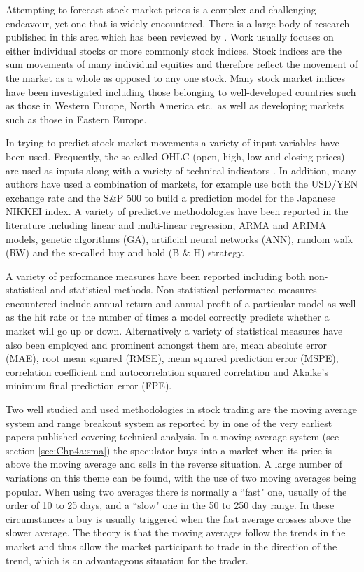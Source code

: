 Attempting to forecast stock market prices is a complex and challenging endeavour, yet one that is widely encountered. There is a large body of research published in this area which has been reviewed by \cite{Atsalakis20095932}. Work usually focuses on either individual stocks or more commonly stock indices. Stock indices are the sum movements of many individual equities and therefore reflect the movement of the market as a whole as opposed to any one stock. Many stock market indices have been investigated including those belonging to well-developed countries such as those in Western Europe, North America etc.\ as well as developing markets such as those in Eastern Europe.

In trying to predict stock market movements a variety of input variables have been used. Frequently, the so-called OHLC (open, high, low and closing prices) are used as inputs along with a variety of technical indicators \citep{Fiess2002353}. In addition, many authors have used a combination of markets, for example \cite{Huang20052513} use both the USD/YEN exchange rate and the S\&P 500 to build a prediction model for the Japanese NIKKEI index. A variety of predictive methodologies have been reported in the literature including linear and multi-linear regression, ARMA and ARIMA models, genetic algorithms (GA), artificial neural networks (ANN), random walk (RW) and the so-called buy and hold (B \& H) strategy.

A variety of performance measures have been reported including both non-statistical and statistical methods. Non-statistical performance measures encountered include annual return and annual profit of a particular model as well as the hit rate or the number of times a model correctly predicts whether a market will go up or down. Alternatively a variety of statistical measures have also been employed and prominent amongst them are, mean absolute error (MAE), root mean squared (RMSE), mean squared prediction error (MSPE), correlation coefficient and autocorrelation squared correlation and Akaike’s minimum final prediction error (FPE).

Two well studied and used methodologies in stock trading are the moving average system and range breakout system as reported by \citep{Brock} in one of the very earliest papers published covering technical analysis. In a moving average system (see section \ref{sec:Chp4a:sma}) the speculator buys into a market when its price is above the moving average and sells in the reverse situation. A large number of variations on this theme can be found, with the use of two moving averages being popular. When using two averages there is normally a \textquotedblleft fast" one, usually of the order of 10 to 25 days,  and a \textquotedblleft slow" one in the 50 to 250 day range. In these circumstances a buy is usually triggered when the fast average crosses above the slower average. The theory is that the moving averages follow the trends in the market and thus allow the market participant to trade in the direction of the trend, which is an advantageous situation for the trader.

